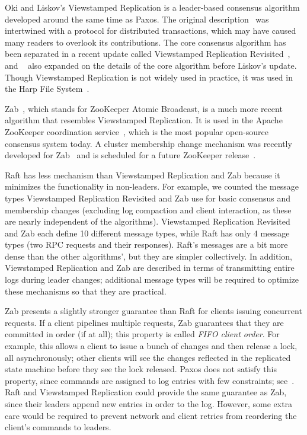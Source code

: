 Oki and Liskov's Viewstamped Replication is a leader-based consensus
algorithm developed around the same time as Paxos. The original
description~\cite{Oki:1988,Oki:1988t} was intertwined with a protocol
for distributed transactions, which may have caused many readers to
overlook its contributions. The core consensus algorithm has been
separated in a recent update called Viewstamped Replication
Revisited~\cite{Liskov:2012}, and \mazieres~\cite{Mazieres:2007} also
expanded on the details of the core algorithm before Liskov's update.
Though Viewstamped Replication is not widely used in practice, it was
used in the Harp File System~\cite{Liskov:1991}.

Zab~\cite{Junqueira:2011}, which stands for ZooKeeper Atomic Broadcast,
is a much more recent algorithm that resembles Viewstamped
Replication. It is used in the Apache ZooKeeper
coordination service~\cite{Hunt:2010}, which is the most popular
open-source consensus system today. A cluster membership change
mechanism was recently developed for Zab~\cite{Shraer:2012} and is
scheduled for a future ZooKeeper release~\cite{ZOOKEEPER-107}.

Raft has less mechanism than Viewstamped Replication and Zab
because it minimizes the functionality in non-leaders. For example, we
counted the message types Viewstamped Replication Revisited and Zab use
for basic consensus and membership changes (excluding log compaction and
client interaction, as these are nearly independent of the algorithms).
Viewstamped Replication Revisited and Zab each define 10 different
message types, while Raft has only 4 message types (two RPC requests and
their responses). Raft's messages are a bit more dense than the other
algorithms', but they are simpler collectively. In addition, Viewstamped
Replication and Zab are described in terms of transmitting entire logs
during leader changes; additional message types will be required to
optimize these mechanisms so that they are practical.

Zab presents a slightly stronger guarantee than Raft for clients issuing
concurrent requests. If a client pipelines multiple requests, Zab
guarantees that they are committed in order (if at all); this property is
called \emph{FIFO client order}. For example, this allows a client to
issue a bunch of changes and then release a lock, all asynchronously;
other clients will see the changes reflected in the replicated state
machine before they see the lock released. Paxos does not satisfy this
property, since commands are assigned to log entries with few
constraints; see~\cite{Junqueira:2011}. Raft and Viewstamped Replication
could provide the same guarantee as Zab, since their leaders append new
entries in order to the log. However, some extra care would be required to
prevent network and client retries from reordering the client's commands
to leaders.
